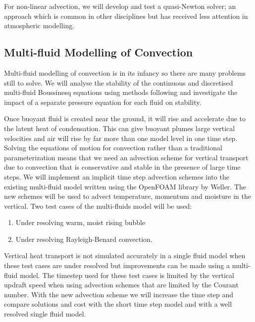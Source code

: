 For non-linear advection, we will develop and test a quasi-Newton solver; an approach which is common in other disciplines \cite[eg][]{ECM04} but has received less attention in atmospheric modelling.


\subsection{Multi-fluid Modelling of Convection}

Multi-fluid modelling of convection is in its infancy so there are many problems still to solve. We will analyse the stability of the continuous and discretised multi-fluid Boussinesq equations using methods following \cite{MWH1x} and investigate the impact of a separate pressure equation for each fluid on stability. 

Once buoyant fluid is created near the ground, it will rise and accelerate due to the latent heat of condensation. This can give buoyant plumes large vertical velocities and air will rise by far more than one model level in one time step. Solving the equations of motion for convection rather than a traditional parameterization means that we need an advection scheme for vertical transport due to convection that is conservative and stable in the presence of large time steps. We will implement an implicit time step advection schemes into the existing multi-fluid model written using the OpenFOAM library by Weller. The new schemes will be used to advect temperature, momentum and moisture in the vertical. Two test cases of the multi-fluids model will be used:
\begin{enumerate}
\item Under resolving  warm, moist rising bubble
\item Under resolving Rayleigh-Benard convection.
\end{enumerate}
Vertical heat transport is not simulated accurately in a single fluid model when these test cases are under resolved but improvements can be made using a multi-fluid model. The timestep used for these test cases is limited by the vertical updraft speed when using advection schemes that are limited by the Courant number. With the new advection scheme we will increase the time step and compare solutions and cost with the short time step model and with a well resolved single fluid model. 





